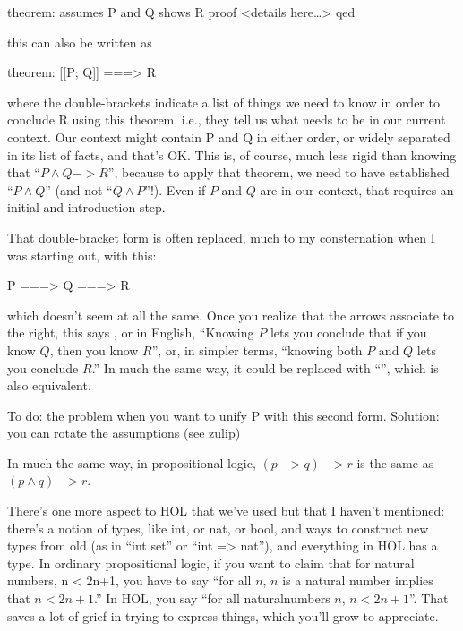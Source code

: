 \begin{IS}
theorem:
   assumes P and Q   
   shows R
proof <details here\ldots > qed
\end{IS}


this can also be written as 
\begin{IS}
theorem:
   [[P; Q]] ===> R
\end{IS}

where the double-brackets indicate a list of things we need to know in order to conclude R using this theorem, i.e., they tell us what needs to be in our current context. Our context might contain P and Q in either order, or widely separated in its list of facts, and that's OK. This is, of course, much less rigid than knowing that ``$P  \wedge  Q -> R$'', because to apply that theorem, we need to have established ``$P  \wedge  Q$'' (and not ``$Q  \wedge  P$''!). Even if $P$ and $Q$ are in our context, that requires an initial and-introduction step. 

That double-bracket form is often replaced, much to my consternation when I was starting out, with this: 

\begin{IS}
    P ===> Q ===> R

\end{IS}
which doesn't seem at all the same. Once you realize that the arrows associate to the right, this says , or in English, ``Knowing $P$ lets you conclude that if you know $Q$, then you know $R$'', or, in simpler terms, ``knowing both $P$ and $Q$ lets you conclude $R$.'' In much the same way, it could be replaced with ``'', which is also equivalent. 

To do: the problem when you want to unify P with this second form. Solution: you can rotate the assumptions (see zulip)

In much the same way, in propositional logic, $(p -> q) -> r$ is the same as $(p  \wedge  q) -> r$.

There's one more aspect to HOL that we've used but that I haven't mentioned: there's a notion of types, like int, or nat, or bool, and ways to construct new types from old (as in ``int set'' or ``int => nat''), and everything in HOL has a type. In ordinary propositional logic, if you want to claim that for natural numbers, n < 2n+1, you have to say ``for all $n$,  $n$ is a natural number implies that  $n < 2n + 1$.'' In HOL, you say ``for all naturalnumbers $n$, $n < 2n + 1$''. That saves a lot of grief in trying to express things, which you'll grow to appreciate. 

